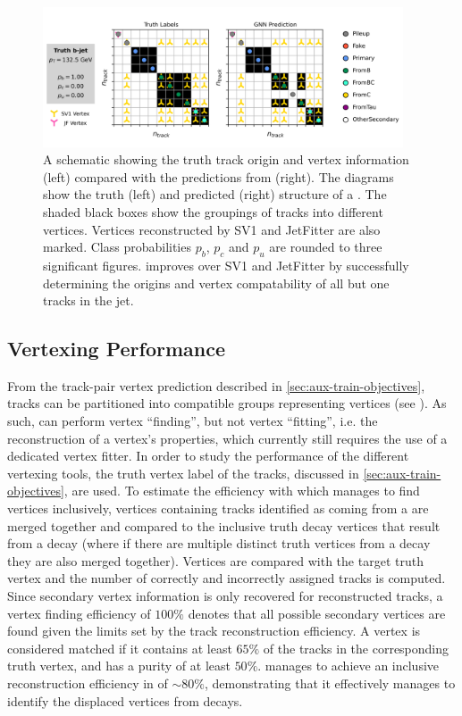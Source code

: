  \begin{figure}[!p]
    \centering
    \includegraphics[width=0.95\textwidth]{chapters/gnn_tagger/figs/bjet_vertex2.pdf}
    \caption{
        A schematic showing the truth track origin and vertex information (left) compared with the predictions from \GNN (right).
        The diagrams show the truth (left) and predicted (right) structure of a \bjet.
        The shaded black boxes show the groupings of tracks into different vertices.
        Vertices reconstructed by SV1 and JetFitter are also marked.
        Class probabilities $p_b$, $p_c$ and $p_u$ are rounded to three significant figures.
        \GNN improves over SV1 and JetFitter by successfully determining the origins and vertex compatability of all but one tracks in the jet.
    }
    \label{fig:bjet_diag_2}
 \end{figure}

 

\subsection{Vertexing Performance}\label{sec:gnn_vert_perf}

From the track-pair vertex prediction described in \cref{sec:aux-train-objectives}, tracks can be partitioned into compatible groups representing vertices (see \cite{serviansky2020set2graph}).
As such, \GNN can perform vertex ``finding'', but not vertex ``fitting'', i.e. the reconstruction of a vertex's properties, which currently still requires the use of a dedicated vertex fitter.
In order to study the performance of the different vertexing tools, the truth vertex label of the tracks, discussed in \cref{sec:aux-train-objectives}, are used.
To estimate the efficiency with which \GNN manages to find vertices inclusively, vertices containing tracks identified as coming from a \bhadron are merged together and compared to the inclusive truth decay vertices that result from a \bhadron decay (where if there are multiple distinct truth vertices from a \bhadron decay they are also merged together).
Vertices are compared with the target truth vertex and the number of correctly and incorrectly assigned tracks is computed.
Since secondary vertex information is only recovered for reconstructed tracks, a vertex finding efficiency of $100\%$ denotes that all possible secondary vertices are found given the limits set by the track reconstruction efficiency.
A vertex is considered matched if it contains at least $65\%$ of the tracks in the corresponding truth vertex, and has a purity of at least $50\%$.
\GNN manages to achieve an inclusive reconstruction efficiency in \bjets of $\sim80\%$, demonstrating that it effectively manages to identify the displaced vertices from \bhadron decays.


